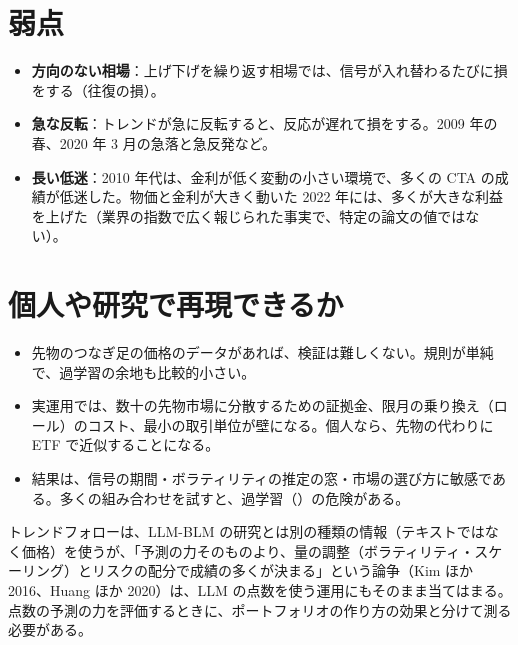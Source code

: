 \section{弱点}

\begin{itemize}
\item \textbf{方向のない相場}：上げ下げを繰り返す相場では、信号が入れ替わるたびに損をする（往復の損）。
\item \textbf{急な反転}：トレンドが急に反転すると、反応が遅れて損をする。2009 年の春、2020 年 3 月の急落と急反発など。
\item \textbf{長い低迷}：2010 年代は、金利が低く変動の小さい環境で、多くの CTA の成績が低迷した。物価と金利が大きく動いた 2022 年には、多くが大きな利益を上げた（業界の指数で広く報じられた事実で、特定の論文の値ではない）。
\end{itemize}

\section{個人や研究で再現できるか}

\begin{itemize}
\item 先物のつなぎ足の価格のデータがあれば、検証は難しくない。規則が単純で、過学習の余地も比較的小さい。
\item 実運用では、数十の先物市場に分散するための証拠金、限月の乗り換え（ロール）のコスト、最小の取引単位が壁になる。個人なら、先物の代わりに ETF で近似することになる。
\item 結果は、信号の期間・ボラティリティの推定の窓・市場の選び方に敏感である。多くの組み合わせを試すと、過学習（）の危険がある。
\end{itemize}

\begin{projbox}
トレンドフォローは、LLM-BLM の研究とは別の種類の情報（テキストではなく価格）を使うが、「予測の力そのものより、量の調整（ボラティリティ・スケーリング）とリスクの配分で成績の多くが決まる」という論争（Kim ほか 2016、Huang ほか 2020）は、LLM の点数を使う運用にもそのまま当てはまる。点数の予測の力を評価するときに、ポートフォリオの作り方の効果と分けて測る必要がある。
\end{projbox}
